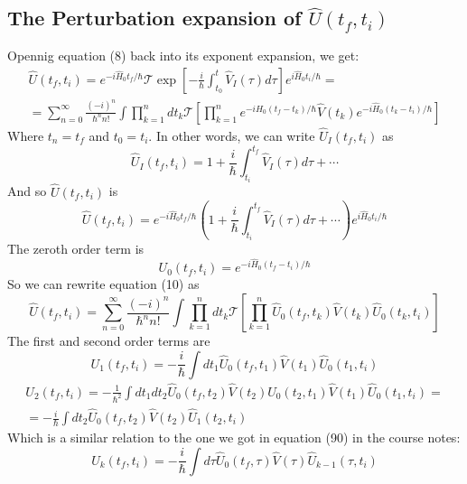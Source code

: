 \documentclass{article}
\begin{document}
\subsection{The Perturbation expansion of $\hat{U}(t_f, t_i)$}
Opennig equation (8) back into its exponent expansion, we get:
\begin{equation}
\begin{gathered}
    \hat{U}(t_f, t_i) = 
    e^{-i \hat{H}_0 t_f / \hbar}
    \mathcal T \exp\left[-\frac{i}{\hbar} \int_{t_0}^{t} \hat{V}_I(\tau) d\tau\right]
    e^{i \hat{H}_0 t_i / \hbar} =
    \\
    = \sum_{n=0}^\infty \frac{\left(-i\right)^n}{\hbar^n n!}
    \int \prod_{k=1}^{n} dt_k
    \mathcal T \left[
        \prod_{k=1}^{n}
        e^{-i \hat{H}_0 \left(t_f - t_k\right) / \hbar}
        \hat{V}(t_k)
        e^{-i \hat{H}_0 \left(t_k - t_i\right) / \hbar}
    \right]
\end{gathered}
\end{equation}
Where $t_n = t_f$ and $t_0 = t_i$. In other words, we can write $\hat{U}_I(t_f, t_i)$ as
\begin{equation}
    \hat{U}_I(t_f, t_i) = 1 + \frac{i}{\hbar}\int_{t_i}^{t_f}\hat{V}_I(\tau)d\tau + \cdots
\end{equation}
And so $\hat{U}(t_f, t_i)$ is
\begin{equation}
    \hat{U}(t_f, t_i) =
        e^{-i \hat{H}_0 t_f / \hbar}
        \left(1 + \frac{i}{\hbar}\int_{t_i}^{t_f}\hat{V}_I(\tau)d\tau+\cdots\right)
        e^{i \hat{H}_0 t_i / \hbar}
\end{equation}
The zeroth order term is
\begin{equation}
    U_0 (t_f, t_i) = e^{-i \hat{H}_0 \left(t_f - t_i\right) / \hbar}
\end{equation}
So we can rewrite equation (10) as
\begin{equation}
    \hat{U}(t_f, t_i) = \sum_{n=0}^\infty \frac{\left(-i\right)^n}{\hbar^n n!}
    \int \prod_{k=1}^{n} dt_k
    \mathcal T \left[
        \prod_{k=1}^{n}
        \hat{U}_0 (t_f, t_k)
        \hat{V}(t_k)
        \hat{U}_0 (t_k, t_i)
    \right]
\end{equation}
The first and second order terms are
\begin{equation}
    U_1 (t_f, t_i) =
    -
    \frac{i}{\hbar}
    \int dt_1
    \hat{U}_0 (t_f, t_1)
    \hat{V}(t_1)
    \hat{U}_0 (t_1, t_i)
\end{equation}
\begin{equation}
\begin{gathered}
    U_2 (t_f, t_i) = -
    \frac{1}{\hbar^2}
    \int dt_1 dt_2
    \hat{U}_0 (t_f, t_2)
    \hat{V}(t_2)
    \hat{U}_0 (t_2, t_1)
    \hat{V}(t_1)
    \hat{U}_0 (t_1, t_i) = 
    \\
    = -
    \frac{i}{\hbar}
    \int dt_2
    \hat{U}_0 (t_f, t_2)
    \hat{V}(t_2)
    \hat{U}_1 (t_2, t_i)
\end{gathered}
\end{equation}
Which is a similar relation to the one we got in equation (90) in the course notes:
\begin{equation}
    U_k (t_f, t_i) = -
    \frac{i}{\hbar}
    \int d\tau
    \hat{U}_0 (t_f, \tau)
    \hat{V}(\tau)
    \hat{U}_{k-1} (\tau, t_i) 
\end{equation}
\end{document}
